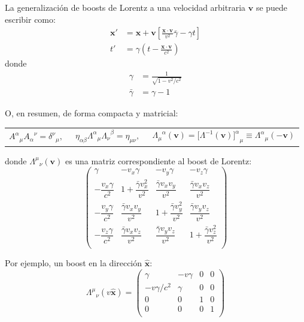 \documentclass[]{article}
\numberwithin{equation}{section}
\begin{document}
La generalización de boosts de Lorentz a una velocidad arbitraria $\mathbf{v}$ se puede escribir como:
\begin{align}
	\mathbf{x}' &= \mathbf{x} + \mathbf{v}\left[\frac{\mathbf{x} \cdot \mathbf{v}}{v^2} \bar{\gamma} - \gamma t\right] \\
	t' &= \gamma \left(t - \frac{\mathbf{x} \cdot \mathbf{v}}{c^2}\right)
\end{align}
donde
\begin{align}
	\gamma &= \frac{1}{\sqrt{1 - v^2/c^2}}\\
	\bar{\gamma} &= \gamma - 1
\end{align}

O, en resumen, de forma compacta y matricial:
\begin{table}[h!]
	\centering
	\begin{tabular}{ccc}
		${A^\alpha}_\mu {A_\alpha}^\nu = {\delta^\nu}_\mu, \ \ $ & $\eta_{\alpha\beta} {\Lambda^\alpha}_\mu {\Lambda_\nu}^\beta = \eta_{\mu\nu},\ \ $ & ${\Lambda_\mu}^\alpha(\mathbf{v}) = [{\Lambda^{-1}(\mathbf{v})]^\alpha}_\mu \equiv {\Lambda^\alpha}_\mu(-\mathbf{v})$
	\end{tabular}
\end{table}

donde ${\Lambda^\mu}_\nu (\mathbf{v})$ es una matriz correspondiente al boost de Lorentz:
\begin{equation}
	\begin{pmatrix}
		\gamma & -v_x\gamma & -v_y\gamma & -v_z\gamma \\
		-\dfrac{v_x\gamma}{c^2} & 1+\dfrac{\bar{\gamma}v_x^2}{v^2} & \dfrac{\bar{\gamma}v_xv_y}{v^2} & \dfrac{\bar{\gamma}v_xv_z}{v^2}\\
		-\dfrac{v_y\gamma}{c^2} & \dfrac{\bar{\gamma}v_xv_y}{v^2} & 1+\dfrac{\bar{\gamma}v_y^2}{v^2} & \dfrac{\bar{\gamma}v_yv_z}{v^2}\\
		-\dfrac{v_z\gamma}{c^2} & \dfrac{\bar{\gamma}v_xv_z}{v^2} & \dfrac{\bar{\gamma}v_yv_z}{v^2} & 1+\dfrac{\bar{\gamma}v_z^2}{v^2} \\
	\end{pmatrix}
\end{equation}

Por ejemplo, un boost en la dirección $\mathbf{\hat{x}}$:
\begin{equation}
	{\Lambda^\mu}_\nu (v\mathbf{\hat{x}}) = \begin{pmatrix}
		\gamma & -v\gamma & 0 & 0 \\
		-v\gamma/c^2 & \gamma & 0 & 0\\
		0 & 0 & 1 & 0\\
		0 & 0 & 0 & 1 \\
	\end{pmatrix}
\end{equation}
\end{document}
